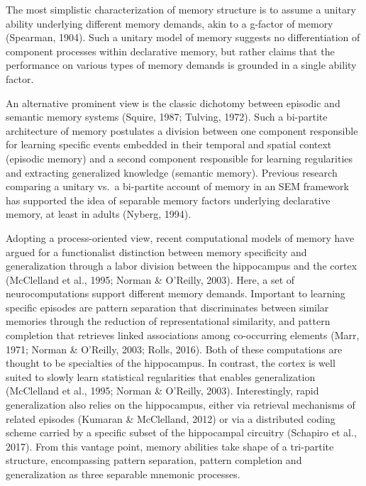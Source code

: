 \documentclass[
  man,floatsintext]{apa6}
\begin{document}
The most simplistic characterization of memory structure is to assume a unitary ability underlying different memory demands, akin to a g-factor of memory (Spearman, 1904). Such a unitary model of memory suggests no differentiation of component processes within declarative memory, but rather claims that the performance on various types of memory demands is grounded in a single ability factor.

An alternative prominent view is the classic dichotomy between episodic and semantic memory systems (Squire, 1987; Tulving, 1972). Such a bi-partite architecture of memory postulates a division between one component responsible for learning specific events embedded in their temporal and spatial context (episodic memory) and a second component responsible for learning regularities and extracting generalized knowledge (semantic memory). Previous research comparing a unitary vs.~a bi-partite account of memory in an SEM framework has supported the idea of separable memory factors underlying declarative memory, at least in adults (Nyberg, 1994).

Adopting a process-oriented view, recent computational models of memory have argued for a functionalist distinction between memory specificity and generalization through a labor division between the hippocampus and the cortex (McClelland et al., 1995; Norman \& O'Reilly, 2003). Here, a set of neurocomputations support different memory demands. Important to learning specific episodes are pattern separation that discriminates between similar memories through the reduction of representational similarity, and pattern completion that retrieves linked associations among co-occurring elements (Marr, 1971; Norman \& O'Reilly, 2003; Rolls, 2016). Both of these computations are thought to be specialties of the hippocampus. In contrast, the cortex is well suited to slowly learn statistical regularities that enables generalization (McClelland et al., 1995; Norman \& O'Reilly, 2003). Interestingly, rapid generalization also relies on the hippocampus, either via retrieval mechanisms of related episodes (Kumaran \& McClelland, 2012) or via a distributed coding scheme carried by a specific subset of the hippocampal circuitry (Schapiro et al., 2017). From this vantage point, memory abilities take shape of a tri-partite structure, encompassing pattern separation, pattern completion and generalization as three separable mnemonic processes.
\end{document}
